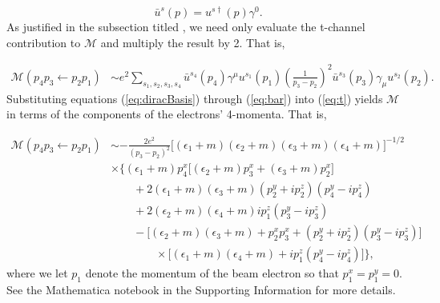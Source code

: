 \documentclass{article}
\begin{document}
\begin{equation}
  \bar{u}^s(p) = u^{s\dag}(p)\gamma^0.
  \label{eq:bar}
\end{equation}
%
As justified in the subsection titled \textit{}, we need only
evaluate the t-channel contribution to $\mathcal{M}$ and multiply the result by
2.
That is, 

\begin{equation} 
  \label{eq:t} 
  \begin{aligned} 
    \mathcal{M}(p_4p_3\leftarrow
    p_2p_1) 
    &\sim
    e^2 \sum_{s_1,s_2,s_3, s_4}
      \bar{u}^{s_4}\left(p_4\right)\gamma^{\mu}u^{s_1}\left(p_1\right)
      \left(\frac{1}{p_3 - p_2}\right)^2
      \bar{u}^{s_3}\left(p_3\right)\gamma_{\mu}u^{s_2}\left(p_2\right).
  \end{aligned} 
\end{equation}
%
Substituting equations (\ref{eq:diracBasis}) through (\ref{eq:bar}) into
(\ref{eq:t}) yields $\mathcal{M}$ in terms of the components of the electrons'
4-momenta.  That is,

\begin{equation}
\begin{aligned}
\mathcal{M}(p_4p_3\leftarrow p_2p_1)
&\sim
-\frac{2e^2}{(p_3 - p_2)^2}
\big[(\epsilon_1 + m)(\epsilon_2 + m)(\epsilon_3 + m)(\epsilon_4 + m)\big]^{-1/2}
\\&\times\Big\{
  (\epsilon_1 + m)p_4^x\big[(\epsilon_2 + m)p_3^x
    + (\epsilon_3 + m)p_2^x\big]
  \\&\qquad+
  2(\epsilon_1 + m)(\epsilon_3 + m)(p_2^y + ip_2^z)(p_4^y - ip_4^z)
  \\&\qquad+
  2(\epsilon_2 + m)(\epsilon_4 + m)ip_1^z(p_3^y - ip_3^z)
  \\&\qquad-
  \big[(\epsilon_2 + m)(\epsilon_3 + m) + p_2^xp_3^x
      + (p_2^y + ip_2^z)(p_3^y - ip_3^z)\big]
  \\&\qquad\qquad\times
  \big[(\epsilon_1 + m)(\epsilon_4 + m) + ip_1^z(p_4^y - ip_4^z)\big]
\Big\},
\end{aligned}
\end{equation}
%
where we let $p_1$ denote the momentum of the beam electron so that $p_1^x =
p_1^y = 0$.
See the Mathematica \cite{Mathematica} notebook in the Supporting Information 
for more details.
\end{document}
